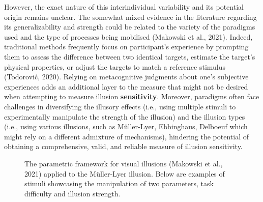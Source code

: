 \documentclass[
  man,
  floatsintext,
  longtable,
  nolmodern,
  notxfonts,
  notimes,
  colorlinks=true,linkcolor=blue,citecolor=blue,urlcolor=blue]{apa7}
\begin{document}
However, the exact nature of this interindividual variability and its
potential origin remains unclear. The somewhat mixed evidence in the
literature regarding its generalizability and strength could be related
to the variety of the paradigms used and the type of processes being
mobilised (Makowski et al., 2021). Indeed, traditional methods
frequently focus on participant's experience by prompting them to assess
the difference between two identical targets, estimate the target's
physical properties, or adjust the targets to match a reference stimulus
(Todorović, 2020). Relying on metacognitive judgments about one's
subjective experiences adds an additional layer to the measure that
might not be desired when attempting to measure illusion
\textbf{sensitivity}. Moreover, paradigms often face challenges in
diversifying the illusory effects (i.e., using multiple stimuli to
experimentally manipulate the strength of the illusion) and the illusion
types (i.e., using various illusions, such as Müller-Lyer, Ebbinghaus,
Delboeuf which might rely on a different admixture of mechanisms),
hindering the potential of obtaining a comprehensive, valid, and
reliable measure of illusion sensitivity.

\begin{figure}

\caption{\label{fig-illusion_framework}The parametric framework for
visual illusions (Makowski et al., 2021) applied to the Müller-Lyer
illusion. Below are examples of stimuli showcasing the manipulation of
two parameters, task difficulty and illusion strength.}


\end{figure}%
\end{document}
